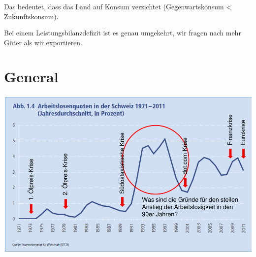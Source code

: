 \documentclass[11pt,twoside,landscape]{article}
\begin{document}
\begin{multicols}{3}
Das bedeutet, dass das Land auf Konsum verzichtet (Gegenwartskonsum < Zukunftskonsum).

Bei einem Leistungsbilanzdefizit ist es genau umgekehrt, wir fragen nach mehr Güter als wir exportieren.

\section{General}
\label{sec:org87dd02e}

{
\begin{center}
\includegraphics[width=.9\linewidth]{img/wirtschaftskrisen.png}
\end{center}
\label{fig:wirtschaftskrisen}
}

\end{multicols}
\end{document}
